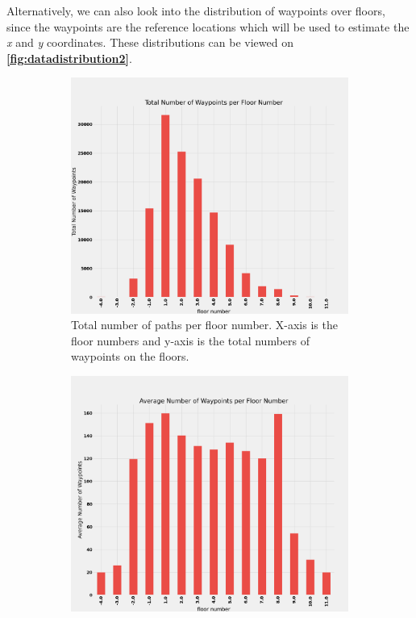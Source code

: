 Alternatively, we can also look into the distribution of waypoints over floors, since the waypoints are the reference locations which will be used to estimate the \textit{x} and \textit{y} coordinates. These distributions can be viewed on \textbf{\autoref{fig:datadistribution2}}.

\begin{figure}[H]
     \centering
     \begin{subfigure}[b]{0.49\textwidth}
         \centering
         \includegraphics[width=\textwidth]{Images/ProblemAnalysis/datadistribution4.png}
         \caption{Total number of paths per floor number. X-axis is the floor numbers and y-axis is the total numbers of waypoints on the floors.}
         \label{fig:totalwaypoints}
     \end{subfigure}
     \hfill
     \begin{subfigure}[b]{0.49\textwidth}
         \centering
         \includegraphics[width=\textwidth]{Images/ProblemAnalysis/datadistribution5.png}

\end{subfigure}
\end{figure}

